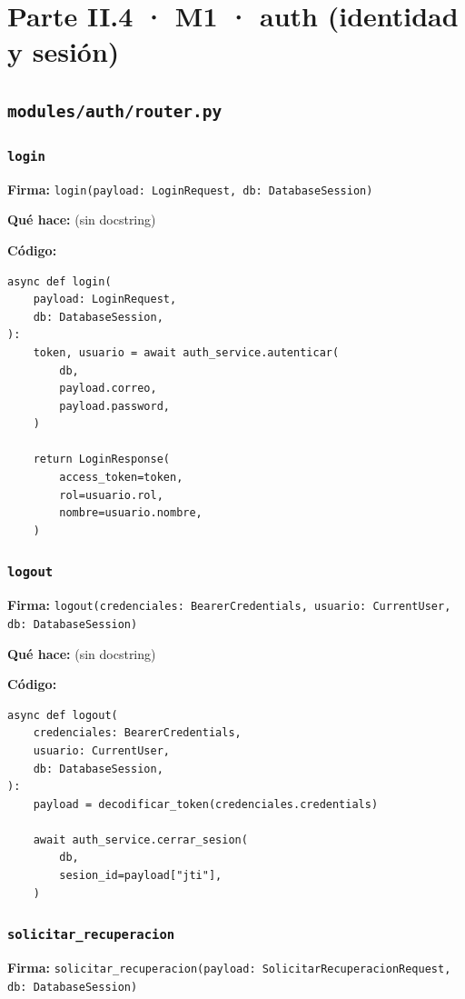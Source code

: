 \documentclass[11pt,a4paper]{article}
\begin{document}
\section{Parte II.4 · M1 · auth (identidad y sesión)}
\subsection{\texttt{modules/auth/router.py}}

\subsubsection*{\texttt{login}}
\textbf{Firma:} \texttt{login(payload: LoginRequest, db: DatabaseSession)}

\textbf{Qué hace:} (sin docstring)

\textbf{Código:}
\begin{lstlisting}
async def login(
    payload: LoginRequest,
    db: DatabaseSession,
):
    token, usuario = await auth_service.autenticar(
        db,
        payload.correo,
        payload.password,
    )

    return LoginResponse(
        access_token=token,
        rol=usuario.rol,
        nombre=usuario.nombre,
    )
\end{lstlisting}

\subsubsection*{\texttt{logout}}
\textbf{Firma:} \texttt{logout(credenciales: BearerCredentials, usuario: CurrentUser, db: DatabaseSession)}

\textbf{Qué hace:} (sin docstring)

\textbf{Código:}
\begin{lstlisting}
async def logout(
    credenciales: BearerCredentials,
    usuario: CurrentUser,
    db: DatabaseSession,
):
    payload = decodificar_token(credenciales.credentials)

    await auth_service.cerrar_sesion(
        db,
        sesion_id=payload["jti"],
    )
\end{lstlisting}

\subsubsection*{\texttt{solicitar\_recuperacion}}
\textbf{Firma:} \texttt{solicitar\_recuperacion(payload: SolicitarRecuperacionRequest, db: DatabaseSession)}
\end{document}
